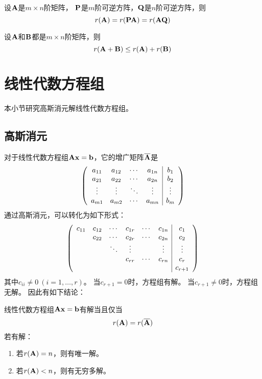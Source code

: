 \begin{theorem}
  设$\mmA$是$m\times n$阶矩阵，
  $\mmP$是$m$阶可逆方阵，$\mmQ$是$n$阶可逆方阵，则
  \[ r(\mmA) = r(\mmP\mmA) = r(\mmA\mmQ) \]
\end{theorem}

\begin{theorem}
  设$\mmA$和$\mmB$都是$m\times n$阶矩阵，则
  \[ r(\mmA+\mmB) \le r(\mmA) + r(\mmB) \]
\end{theorem}

\section{线性代数方程组}
本小节研究高斯消元解线性代数方程组。

\subsection{高斯消元}
对于线性代数方程组$\mmA\mvx=\mvb$，它的增广矩阵$\overline{\mmA}$是
\begin{displaymath}
  \mmat{cccc|c}{
    a_{11} & a_{12} & \cdots & a_{1n} & b_1 \\
    a_{21} & a_{22} & \cdots & a_{2n} & b_2 \\
    \vdots & \vdots & \ddots & \vdots & \vdots \\
    a_{m1} & a_{m2} & \cdots & a_{mn} & b_m 
  }
\end{displaymath}
通过高斯消元，可以转化为如下形式：
\begin{equation} \label{eq-gauss-elim}
  \mmat{cccccc|c}{
    c_{11} & c_{12} & \cdots & c_{1r} & \cdots & c_{1n} & c_1    \\
           & c_{22} & \cdots & c_{2r} & \cdots & c_{2n} & c_2    \\
           &        & \ddots & \vdots &        & \vdots & \vdots \\
           &        &        & c_{rr} & \cdots & c_{rn} & c_r    \\
           &        &        &        &        &        & c_{r+1}
  }
\end{equation}
其中$c_{ii}\neq 0\ (i=1,\dots,r)$。
当$c_{r+1}=0$时，方程组有解。
当$c_{r+1}\neq 0$时，方程组无解。
因此有如下结论：

\begin{theorem}[方程组有解的判定条件]
  线性代数方程组$\mmA\mvx=\mvb$有解当且仅当
  \[ r(\mmA) = r(\overline{\mmA}) \]
  若有解：
  \begin{enumerate}
    \item 若$r(\mmA)=n$，则有唯一解。
    \item 若$r(\mmA) < n$，则有无穷多解。
  \end{enumerate}
\end{theorem}

